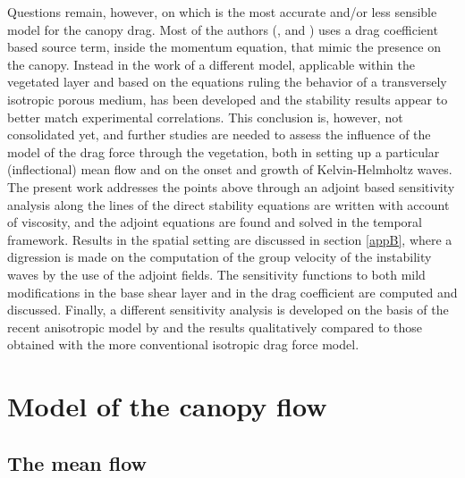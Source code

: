Questions remain, however, on which is the most accurate and/or less sensible model for the canopy drag. Most of the authors (\citet{raupach1996coherent}, \citet{py2004mixing} and \citet{singh2016linear}) uses a drag coefficient based source term, inside the momentum equation, that mimic the presence on the canopy. Instead in the work of \citet{zampogna2016instability} a different model, applicable within the vegetated layer and
based on the equations ruling the behavior of a transversely isotropic porous medium, has been
developed and the stability results appear to better match experimental correlations. This conclusion
is, however, not consolidated yet, and further studies are needed to assess the influence of the model
of the drag force through the vegetation, both in setting up a particular (inflectional) mean flow and
on the onset and growth of Kelvin-Helmholtz waves.
The present work addresses the points above through an adjoint based sensitivity analysis along
the lines of \citet{bottaro2003effect} the direct stability equations are written with account of viscosity, and
the adjoint equations are found and solved in the temporal framework. Results in the spatial setting
are discussed in section \ref{appB}, where a digression is made on the computation of the group velocity
of the instability waves by the use of the adjoint fields. The sensitivity functions to both mild
modifications in the base shear layer and in the drag coefficient are computed and discussed. Finally,
a different sensitivity analysis is developed on the basis of the recent anisotropic model by \citet{zampogna2016instability} and the results qualitatively compared to those obtained with the more conventional
isotropic drag force model.



\section{Model of the canopy flow}
\label{sec:2ch3}

\subsection{The mean flow}


